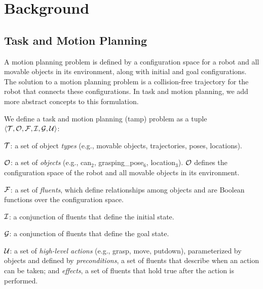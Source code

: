 \section{Background}
\subsection{Task and Motion Planning}

A motion planning problem is defined by a configuration space for a
robot and all movable objects in its environment, along with initial
and goal configurations. The solution to a motion planning problem is
a collision-free trajectory for the robot that connects these
configurations. In task and motion planning, we add more abstract
concepts to this formulation.


\begin{defn}
We define a task and motion planning ({\sc tamp}) problem as a tuple
$\langle \mathcal{T}, \mathcal{O}, \mathcal{F}, \mathcal{I}, \mathcal{G}, \mathcal{U} \rangle$:
\begin{tightlist}
\item $\mathcal{T}$: a set of object \emph{types} (e.g., movable objects,
  trajectories, poses, locations).

\item $\mathcal{O}$: a set of \emph{objects} (e.g., can$_{2}$, grasping\_pose$_{6}$, location$_{3}$).
  $\mathcal{O}$ defines the configuration space of the robot and all movable objects in its environment.

\item $\mathcal{F}$: a set of \emph{fluents}, which define relationships among
  objects and are Boolean functions over the configuration
  space.

\item $\mathcal{I}$: a conjunction of fluents that define the initial state.

\item $\mathcal{G}$: a conjunction of fluents that define the goal state.

\item $\mathcal{U}$: a set of \emph{high-level actions} (e.g., grasp, move,
  putdown), parameterized by objects and defined by
  \emph{preconditions}, a set of fluents that describe when an action
  can be taken; and \emph{effects}, a set of fluents that hold true
  after the action is performed.
\end{tightlist}
\end{defn}

